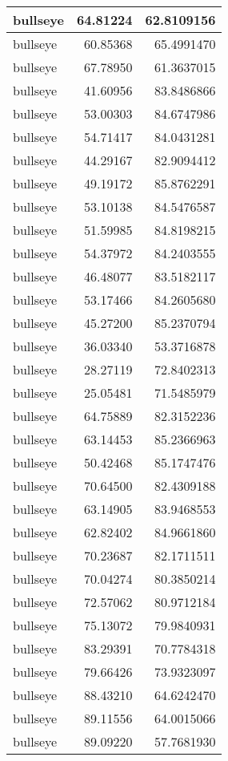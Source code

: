 \documentclass[
]{book}
\theoremstyle{definition}
\theoremstyle{definition}
\theoremstyle{definition}
\theoremstyle{definition}
\theoremstyle{remark}
\begin{document}
\begin{tabular}{l|r|r}
\hline
bullseye & 64.81224 & 62.8109156\\
\hline
bullseye & 60.85368 & 65.4991470\\
\hline
bullseye & 67.78950 & 61.3637015\\
\hline
bullseye & 41.60956 & 83.8486866\\
\hline
bullseye & 53.00303 & 84.6747986\\
\hline
bullseye & 54.71417 & 84.0431281\\
\hline
bullseye & 44.29167 & 82.9094412\\
\hline
bullseye & 49.19172 & 85.8762291\\
\hline
bullseye & 53.10138 & 84.5476587\\
\hline
bullseye & 51.59985 & 84.8198215\\
\hline
bullseye & 54.37972 & 84.2403555\\
\hline
bullseye & 46.48077 & 83.5182117\\
\hline
bullseye & 53.17466 & 84.2605680\\
\hline
bullseye & 45.27200 & 85.2370794\\
\hline
bullseye & 36.03340 & 53.3716878\\
\hline
bullseye & 28.27119 & 72.8402313\\
\hline
bullseye & 25.05481 & 71.5485979\\
\hline
bullseye & 64.75889 & 82.3152236\\
\hline
bullseye & 63.14453 & 85.2366963\\
\hline
bullseye & 50.42468 & 85.1747476\\
\hline
bullseye & 70.64500 & 82.4309188\\
\hline
bullseye & 63.14905 & 83.9468553\\
\hline
bullseye & 62.82402 & 84.9661860\\
\hline
bullseye & 70.23687 & 82.1711511\\
\hline
bullseye & 70.04274 & 80.3850214\\
\hline
bullseye & 72.57062 & 80.9712184\\
\hline
bullseye & 75.13072 & 79.9840931\\
\hline
bullseye & 83.29391 & 70.7784318\\
\hline
bullseye & 79.66426 & 73.9323097\\
\hline
bullseye & 88.43210 & 64.6242470\\
\hline
bullseye & 89.11556 & 64.0015066\\
\hline
bullseye & 89.09220 & 57.7681930\\

\end{tabular}
\end{document}
